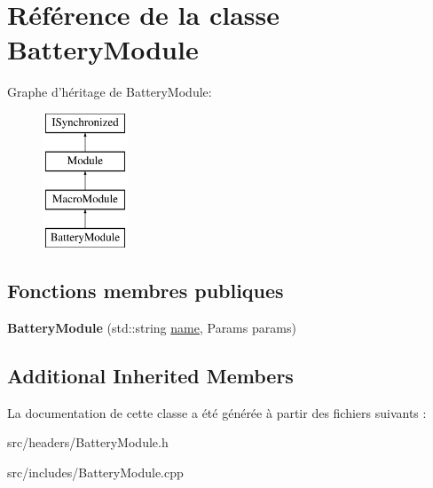 \hypertarget{classBatteryModule}{\section{Référence de la classe Battery\-Module}
\label{classBatteryModule}
}
Graphe d'héritage de Battery\-Module\-:\begin{figure}[H]
\begin{center}
\leavevmode
\includegraphics[height=4.000000cm]{classBatteryModule}
\end{center}
\end{figure}
\subsection*{Fonctions membres publiques}
\begin{DoxyCompactItemize}
\item 
\hypertarget{classBatteryModule_aa801966a98105ec8c26ad0792fc5332e}{{\bfseries Battery\-Module} (std\-::string \hyperlink{classModule_a794fbb44972c7c73cc197159093e66d1}{name}, Params params)}\label{classBatteryModule_aa801966a98105ec8c26ad0792fc5332e}

\end{DoxyCompactItemize}
\subsection*{Additional Inherited Members}


La documentation de cette classe a été générée à partir des fichiers suivants \-:\begin{DoxyCompactItemize}
\item 
src/headers/Battery\-Module.\-h\item 
src/includes/Battery\-Module.\-cpp\end{DoxyCompactItemize}
